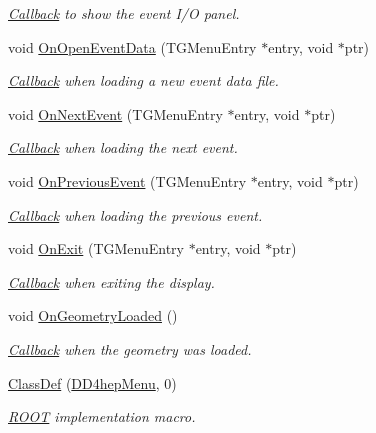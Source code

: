 \begin{DoxyCompactItemize}
\begin{DoxyCompactList}\small\item\em \hyperlink{class_d_d4hep_1_1_callback}{Callback} to show the event I/O panel. \item\end{DoxyCompactList}\item 
void \hyperlink{class_d_d4hep_1_1_d_d4hep_menu_ac8428b7326df0a54c672ece045fe8d97}{OnOpenEventData} (TGMenuEntry $\ast$entry, void $\ast$ptr)
\begin{DoxyCompactList}\small\item\em \hyperlink{class_d_d4hep_1_1_callback}{Callback} when loading a new event data file. \item\end{DoxyCompactList}\item 
void \hyperlink{class_d_d4hep_1_1_d_d4hep_menu_aed31811bd4340d374fb002792c17cecd}{OnNextEvent} (TGMenuEntry $\ast$entry, void $\ast$ptr)
\begin{DoxyCompactList}\small\item\em \hyperlink{class_d_d4hep_1_1_callback}{Callback} when loading the next event. \item\end{DoxyCompactList}\item 
void \hyperlink{class_d_d4hep_1_1_d_d4hep_menu_aa5da4d833f39a73fe9f22e0b0016018e}{OnPreviousEvent} (TGMenuEntry $\ast$entry, void $\ast$ptr)
\begin{DoxyCompactList}\small\item\em \hyperlink{class_d_d4hep_1_1_callback}{Callback} when loading the previous event. \item\end{DoxyCompactList}\item 
void \hyperlink{class_d_d4hep_1_1_d_d4hep_menu_a62954b16db94eb57f3c88600042f1a3e}{OnExit} (TGMenuEntry $\ast$entry, void $\ast$ptr)
\begin{DoxyCompactList}\small\item\em \hyperlink{class_d_d4hep_1_1_callback}{Callback} when exiting the display. \item\end{DoxyCompactList}\item 
void \hyperlink{class_d_d4hep_1_1_d_d4hep_menu_a4cc12c7e0047c638119e0807f860fbc1}{OnGeometryLoaded} ()
\begin{DoxyCompactList}\small\item\em \hyperlink{class_d_d4hep_1_1_callback}{Callback} when the geometry was loaded. \item\end{DoxyCompactList}\item 
\hyperlink{class_d_d4hep_1_1_d_d4hep_menu_af3b9cf3c445924532b16883e46833624}{ClassDef} (\hyperlink{class_d_d4hep_1_1_d_d4hep_menu}{DD4hepMenu}, 0)
\begin{DoxyCompactList}\small\item\em \hyperlink{namespace_r_o_o_t}{ROOT} implementation macro. \item\end{DoxyCompactList}\end{DoxyCompactItemize}
